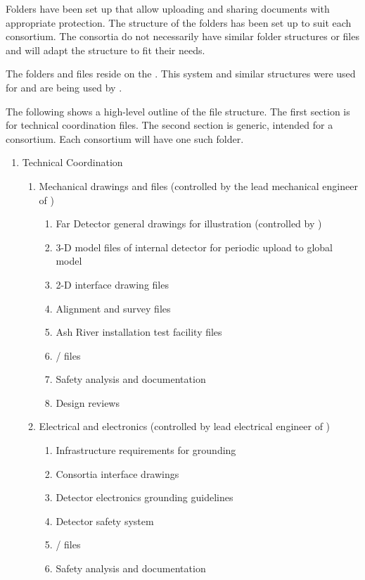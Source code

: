 Folders have been set up that allow uploading and sharing documents
with appropriate protection. The structure of the folders has been set
up to suit each consortium. The consortia do not necessarily have
similar folder structures or files and will adapt the structure to fit
their needs.


The folders and files reside on the . This system and
similar structures were used for  and are being
used by .


The following shows a high-level outline of the file structure. The
first section is for technical coordination files. The second
section is generic, intended for a consortium. Each consortium will have one such
folder.
\begin{enumerate}
 \item Technical Coordination
 \begin{enumerate}
  \item Mechanical drawings and files (controlled by the lead mechanical engineer of )
  \begin{enumerate}
    \item Far Detector general drawings for illustration (controlled by )
    \item 3-D model files of internal detector for periodic upload to global model
    \item 2-D interface drawing files    
    \item Alignment and survey files
    \item Ash River installation test facility files
    \item {}/ files
    \item Safety analysis and documentation
    \item Design reviews
  \end{enumerate}
  \item Electrical and electronics (controlled by lead electrical engineer of )
  \begin{enumerate}
    \item Infrastructure requirements for grounding
    \item Consortia interface drawings
    \item Detector electronics grounding guidelines
    \item Detector safety system
    \item {}/ files
    \item Safety analysis and documentation

\end{enumerate}
\end{enumerate}
\end{enumerate}
